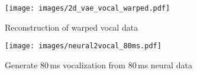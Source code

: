 \documentclass[../CLthesis.tex]{subfiles}
\begin{document}
\begin{figure}[H]
    \centering
    \texttt{[image: images/2d\_vae\_vocal\_warped.pdf]}
    \caption{Reconstruction of warped vocal data}
    \label{fig:whole_motif}
\end{figure}

\begin{figure}[H]
    \centering
    \texttt{[image: images/neural2vocal\_80ms.pdf]}
    \caption{Generate 80\,ms vocalization from 80\,ms neural data}
    \label{fig:neuro2voc_80ms}
\end{figure}



\end{document}
